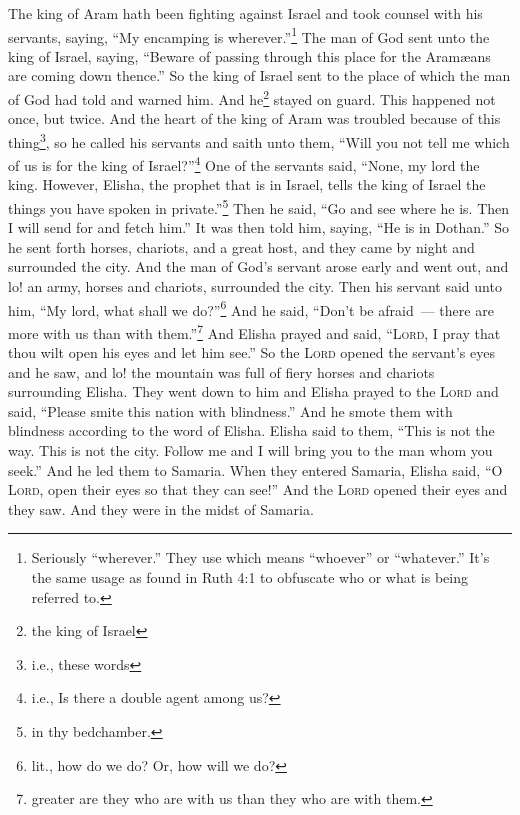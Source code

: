 \begin{inparaenum}
     The king of Aram hath been fighting against Israel and took counsel with his servants, saying, ``My encamping is wherever.''\footnote{Seriously ``wherever.'' They use  which means ``whoever'' or ``whatever.'' It's the same usage as found in Ruth 4:1 to obfuscate who or what is being referred to.}%
     The man of God sent unto the king of Israel, saying, ``Beware of passing through this place for the Aram\ae{}ans are coming down thence.''%
     So the king of Israel sent to the place of which the man of God had told and warned him. And he\footnote{the king of Israel} stayed on guard. This happened not once, but twice.%
     And the heart of the king of Aram was troubled because of this thing\footnote{i.e., these words}, so he called his servants and saith unto them, ``Will you not tell me which of us is for the king of Israel?''\footnote{i.e., Is there a double agent among us?}%
     One of the servants said, ``None, my lord the king. However, Elisha, the prophet that is in Israel, tells the king of Israel the things you have spoken in private.''\footnote{in thy bedchamber.}%
     Then he said, ``Go and see where he is. Then I will send for and fetch him.'' It was then told him, saying, ``He is in Dothan.''%
     So he sent forth horses, chariots, and a great host, and they came by night and surrounded the city.%
     And the man of God's servant arose early and went out, and lo! an army, horses and chariots, surrounded the city. Then his servant said unto him, ``My lord, what shall we do?''\footnote{lit., how do we do? Or, how will we do?}%
     And he said, ``Don't be afraid~--- there are more with us than with them.''\footnote{greater are they who are with us than they who are with them.}%
     And Elisha prayed and said, ``\textsc{Lord}, I pray that thou wilt open his eyes and let him see.'' So the \textsc{Lord} opened the servant's eyes and he saw, and lo! the mountain was full of fiery horses and chariots surrounding Elisha.%
     They went down to him and Elisha prayed to the \textsc{Lord} and said, ``Please smite this nation with blindness.'' And he smote them with blindness according to the word of Elisha.%
     Elisha said to them, ``This is not the way. This is not the city. Follow me and I will bring you to the man whom you seek.'' And he led them to Samaria.%
     When they entered Samaria, Elisha said, ``O \textsc{Lord}, open their eyes so that they can see!'' And the \textsc{Lord} opened their eyes and they saw. And they were in the midst of Samaria.%

\end{inparaenum}
